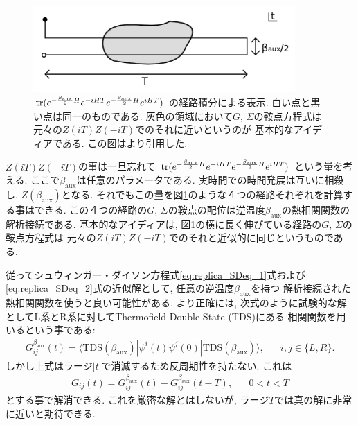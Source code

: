 \begin{figure}[ht]
	\centering
	\includegraphics[width=10cm]{figures/beta_aux}
	\caption{$\mathrm{tr}(e^{-\frac{\beta_{\mathrm{aux}}}{2}H}e^{-iHT}e^{-\frac{\beta_{\mathrm{aux}}}{2}H}e^{iHT})$
		の経路積分による表示. 白い点と黒い点は同一のものである. 
		灰色の領域において$G$, $\Sigma$の鞍点方程式は元々の$Z(iT)Z(-iT)$でのそれに近いというのが
		基本的なアイディアである. この図は\cite{stanford_chaos}より引用した.
	}
	\label{fig:beta_aux}
\end{figure}
$Z(iT)Z(-iT)$の事は一旦忘れて
$\mathrm{tr}(e^{-\frac{\beta_{\mathrm{aux}}}{2}H}e^{-iHT}e^{-\frac{\beta_{\mathrm{aux}}}{2}H}e^{iHT})$
という量を考える. ここで$\beta_{\mathrm{aux}}$は任意のパラメータである. 
実時間での時間発展は互いに相殺し, $Z(\beta_{\mathrm{aux}})$となる. 
それでもこの量を図\ref{fig:beta_aux}のような４つの経路それぞれを計算する事はできる. 
この４つの経路の$G$, $\Sigma$の鞍点の配位は逆温度$\beta_{\mathrm{aux}}$の熱相関関数の解析接続である. 
基本的なアイディアは, 図\ref{fig:beta_aux}の横に長く伸びている経路の$G$, $\Sigma$の鞍点方程式は
元々の$Z(iT)Z(-iT)$でのそれと近似的に同じというものである. 

従ってシュウィンガー・ダイソン方程式\eqref{eq:replica_SDeq_1}式および
\eqref{eq:replica_SDeq_2}式の近似解として, 任意の逆温度$\beta_{\mathrm{aux}}$を持つ
解析接続された熱相関関数を使うと良い可能性がある. 
より正確には, 次式のように試験的な解としてL系とR系に対してThermofield Double State (TDS)にある
相関関数を用いるという事である:
\begin{align}
	G_{ij}^{\beta_{\mathrm{aux}}}(t)
	= \langle \mathrm{TDS}(\beta_{\mathrm{aux}})
		|\psi^i(t)\psi^j(0)|\mathrm{TDS}(\beta_{\mathrm{aux}}) \rangle,
	\hspace{20pt}i,j \in \{L, R\}.
\end{align}
しかし上式はラージ$|t|$で消滅するため反周期性を持たない. 
これは
\begin{align}
	G_{ij}(t) = G_{ij}^{\beta_{\mathrm{aux}}}(t) - G_{ij}^{\beta_{\mathrm{aux}}}(t-T),\hspace{20pt}
	0 < t < T
	\label{eq:almost_true_solution_for_SDeq}
\end{align}
とする事で解消できる. 
これを厳密な解とはしないが, ラージ$T$では真の解に非常に近いと期待できる. 

